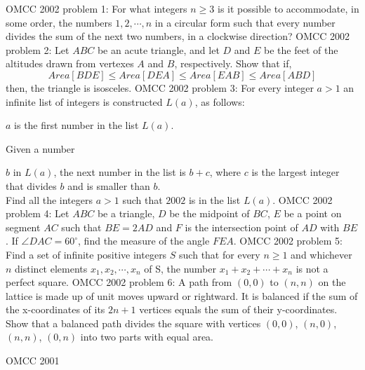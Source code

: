 OMCC 2002 problem 1:  For what integers $ n\ge 3$ is it possible to accommodate, in some order, the numbers $ 1,2,\cdots, n$ in a circular form such that every number divides the sum of the next two numbers, in a clockwise direction? 
OMCC 2002 problem 2:  Let $ ABC$ be an acute triangle, and let $ D$ and $ E$ be the feet of the altitudes drawn from vertexes $ A$ and $ B$, respectively. Show that if,
\[ Area[BDE]\le Area[DEA]\le Area[EAB]\le Area[ABD] \]
then, the triangle is isosceles. 
OMCC 2002 problem 3:  For every integer $ a>1$ an infinite list of integers is constructed $ L(a)$, as follows:
\begin{itemize}
\end{itemize}
$ a$ is the first number in the list $ L(a)$.
\begin{itemize}
Given a number\end{itemize}
$ b$ in $ L(a)$, the next number in the list is $ b+c$, where $ c$ is the largest integer that divides $ b$ and is smaller than $ b$. \\
Find all the integers $ a>1$ such that $ 2002$ is in the list $ L(a)$. 
OMCC 2002 problem 4:  Let $ ABC$ be a triangle, $ D$ be the midpoint of $ BC$, $ E$ be a point on segment $ AC$ such that $ BE=2AD$ and $ F$ is the intersection point of $ AD$ with $ BE$. If $ \angle DAC=60^{\circ}$, find the measure of the angle $ FEA$. 
OMCC 2002 problem 5:  Find a set of infinite positive integers $ S$ such that for every $ n\ge 1$ and whichever $ n$ distinct elements $ x_1,x_2,\cdots, x_n$ of S, the number $ x_1+x_2+\cdots +x_n$ is not a perfect square. 
OMCC 2002 problem 6:  A path from $ (0,0)$ to $ (n,n)$ on the lattice is made up of unit moves upward or rightward. It is balanced if the sum of the x-coordinates of its $ 2n+1$ vertices equals the sum of their y-coordinates. Show that a balanced path divides the square with vertices $ (0,0)$, $ (n,0)$, $ (n,n)$, $ (0,n)$ into two parts with equal area. 

OMCC 2001 

